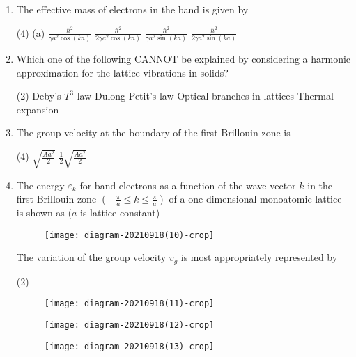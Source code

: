 \begin{enumerate}
	\item The effective mass of electrons in the band is given by
{	}
\begin{tasks}(4)
\task[\textbf{A.}] (a) $\frac{\hbar^{2}}{\gamma a^{2} \cos (k a)}$
\task[\textbf{B.}] $\frac{\hbar^{2}}{2 \gamma a^{2} \cos (k a)}$
\task[\textbf{C.}] $\frac{\hbar^{2}}{\gamma a^{2} \sin (k a)}$
\task[\textbf{D.}] $\frac{\hbar^{2}}{2 \gamma a^{2} \sin (k a)}$
\end{tasks}
	\item Which one of the following CANNOT be explained by considering a harmonic approximation for the lattice vibrations in solids?
{	}
\begin{tasks}(2)
\task[\textbf{A.}] Deby's $T^{3}$ law
\task[\textbf{B.}] Dulong Petit's law
\task[\textbf{C.}] Optical branches in lattices
\task[\textbf{D.}]  Thermal expansion
\end{tasks}
	\item The group velocity at the boundary of the first Brillouin zone is
{	}
\begin{tasks}(4)
\task[\textbf{C.}] $\sqrt{\frac{A a^{2}}{2}}$
\task[\textbf{D.}] $\frac{1}{2} \sqrt{\frac{A a^{2}}{2}}$
\end{tasks}
	\item The energy $\varepsilon_{k}$ for band electrons as a function of the wave vector $k$ in the first Brillouin zone $\left(-\frac{\pi}{a} \leq k \leq \frac{\pi}{a}\right)$ of a one dimensional monoatomic lattice is shown as $(a$ is lattice constant)\\
	\begin{figure}[H]
		\centering
		\texttt{[image: diagram-20210918(10)-crop]}
	\end{figure}
	The variation of the group velocity $v_{g}$ is most appropriately represented by
{	}
\begin{tasks}(2)
\task[\textbf{A.}] \begin{figure}[H]
	\centering
	\texttt{[image: diagram-20210918(11)-crop]}
\end{figure}
\task[\textbf{B.}] \begin{figure}[H]
	\centering
	\texttt{[image: diagram-20210918(12)-crop]}
\end{figure}
\task[\textbf{C.}] \begin{figure}[H]
	\centering
	\texttt{[image: diagram-20210918(13)-crop]}

\end{figure}
\end{tasks}
\end{enumerate}

